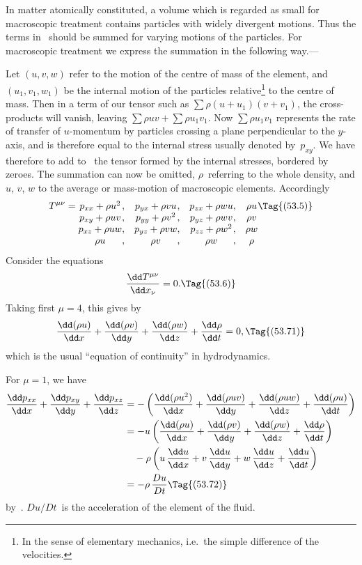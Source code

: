 \documentclass[12pt]{book}
\begin{document}
In matter atomically constituted, a volume which is regarded as small for
macroscopic treatment contains particles with widely divergent motions. Thus
the terms in~ should be summed for varying motions of the particles.
For macroscopic treatment we express the summation in the following way.---

{\Loosen Let $(u, v, w)$ refer to the motion of the centre of mass of the element, and
%
$(u_{1}, v_{1}, w_{1})$ be the internal motion of the particles relative\footnote
  {In the sense of elementary mechanics, i.e.\ the simple difference of the velocities.}
to the centre of
mass. Then in a term of our tensor such as $\sum \rho(u + u_{1})(v + v_{1})$, the cross-products
will vanish, leaving $\sum \rho u v + \sum \rho u_{1}v_{1}$. Now $\sum \rho u_{1}v_{1}$ represents the rate of
transfer of $u$-momentum by particles crossing a plane perpendicular to the
$y$-axis, and is therefore equal to the internal stress usually denoted by~$p_{xy}$.
We have therefore to add to~ the tensor formed by the internal stresses,
bordered by zeroes. The summation can now be omitted, $\rho$~referring to the
whole density, and $u$, $v$, $w$ to the average or mass-motion of macroscopic
elements. Accordingly}
\[
T^{\mu\nu} =
\begin{array}[t]{@{}c@{,\quad}c@{,\quad}c@{,\quad}c@{}}
  p_{xx} + \rho u^{2} & p_{yx} + \rho v u & p_{zx} + \rho w u & \rho u\\
  p_{xy} + \rho u v & p_{yy} + \rho v^{2} & p_{yz} + \rho w v & \rho v\\
  p_{xz} + \rho u w & p_{yz} + \rho v w & p_{zz} + \rho w^{2} & \rho w\\
  \rho u & \rho v & \rho w & \rho\\
\end{array}
\Tag{(53.5)}
\]
Consider the equations
\[
\frac{\dd T^{\mu\nu}}{\dd x_{\nu}} = 0.
\Tag{(53.6)}
\]
Taking first $\mu = 4$, this gives by~
\[
\frac{\dd(\rho u)}{\dd x} + \frac{\dd(\rho v)}{\dd y} + \frac{\dd(\rho w)}{\dd z} + \frac{\dd\rho}{\dd t} = 0,
\Tag{(53.71)}
\]
which is the usual ``equation of continuity'' in hydrodynamics.
%
%

For $\mu = 1$, we have
\begin{align*}
  \frac{\dd p_{xx}}{\dd x} + \frac{\dd p_{xy}}{\dd y} + \frac{\dd p_{xz}}{\dd z}
  &= -\left(\frac{\dd(\rho u^{2})}{\dd x} + \frac{\dd(\rho u v)}{\dd y}
          + \frac{\dd(\rho u w)}{\dd z} + \frac{\dd(\rho u)}{\dd t}\right) \\
  &= -u \left(\frac{\dd(\rho u)}{\dd x} + \frac{\dd(\rho v)}{\dd y}
          + \frac{\dd(\rho w)}{\dd z} + \frac{\dd\rho}{\dd t}\right) \\
  &\quad -\rho \left(u\, \frac{\dd u}{\dd x} + v\, \frac{\dd u}{\dd y}
          + w\, \frac{\dd u}{\dd z} + \frac{\dd u}{\dd t}\right) \\
  &= -\rho\, \frac{Du}{Dt}
\Tag{(53.72)}
\end{align*}
by~. $Du/Dt$~is the acceleration of the element of the fluid.
\end{document}
